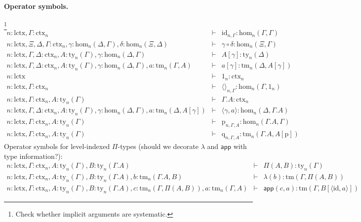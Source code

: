 \documentclass[11pt,a4paper]{article}
\theoremstyle{plain}
\theoremstyle{definition}
\newcommand{\id}{\mathsf{id}}
\newcommand{\app}[2]{{#1\,#2}} %
\def\Hom{\mathrm{hom}}
\def\id{\mathrm{id}}
\def\lctx{\mathrm{lctx}}
\newcommand{\ctx}{\mathrm{ctx}}
\newcommand{\ty}{\mathrm{ty}}
\newcommand{\tm}{\mathrm{tm}}
\newcommand{\tuple}[1]{\langle #1 \rangle}
\newcommand{\cext}{.}
\def\p{\mathrm{p}}
\def\q{\mathrm{q}}
\def\app{\mathsf{app}}
\begin{document}
\paragraph{Operator symbols.} \footnote{Check whether implicit arguments are systematic.}
\begin{eqnarray*}
n : \lctx, \Gamma : \ctx_n &\vdash& \id_{n,\Gamma} : \Hom_n(\Gamma,\Gamma)\\
n : \lctx, \Xi,\Delta,\Gamma : \ctx_n, \gamma : \Hom_n(\Delta,\Gamma), \delta : \Hom_n(\Xi,\Delta) &\vdash&
\gamma \circ \delta : \Hom_n(\Xi,\Gamma)\\
n : \lctx, \Gamma,\Delta : \ctx_n, A:\ty_n(\Gamma), \gamma : \Hom_n(\Delta,\Gamma) &\vdash&
A[\gamma] : \ty_n(\Delta)\\
n : \lctx, \Gamma,\Delta : \ctx_n, A:\ty_n(\Gamma), \gamma : \Hom_n(\Delta,\Gamma), a:\tm_n(\Gamma,A) &\vdash&  a[\gamma] : \tm_n(\Delta,A[\gamma])\\
n : \lctx &\vdash& 1_n : \ctx_n\\
n : \lctx, \Gamma : \ctx_n &\vdash& \tuple{}_{n,\Gamma} : \Hom_n(\Gamma,1_n)\\
n : \lctx, \Gamma : \ctx_n, A:\ty_n (\Gamma) &\vdash& \Gamma \cext A : \ctx_n \\
n : \lctx, \Gamma,\Delta : \ctx_n , A:\ty_n (\Gamma), \gamma : \Hom_n (\Delta,\Gamma), a:\tm_n (\Delta,A[\gamma]) &\vdash& \tuple{\gamma,a} : \Hom_n (\Delta,\Gamma\cext A)\\
n : \lctx, \Gamma : \ctx_n , A:\ty_n (\Gamma) &\vdash& \p_{n,\Gamma,A}: \Hom_n (\Gamma\cext A,\Gamma)\\
n : \lctx, \Gamma : \ctx_n , A:\ty_n (\Gamma) &\vdash& \q_{n,\Gamma,A}: \tm_n (\Gamma\cext A,A[\p])
\end{eqnarray*}
Operator symbols for level-indexed $\Pi$-types (should we decorate $\lambda$ and $\app$ with type information?):
\begin{eqnarray*}
n : \lctx, \Gamma : \ctx_n, A : \ty_n(\Gamma), B : \ty_n(\Gamma.A)&\vdash& \Pi(A,B) : \ty_n(\Gamma)\\
n : \lctx, \Gamma : \ctx_n, A : \ty_n(\Gamma), B : \ty_n(\Gamma.A), b : \tm_n(\Gamma.A, B) &\vdash& \lambda(b) : \tm(\Gamma,\Pi(A,B))\\
n : \lctx, \Gamma : \ctx_n, A : \ty_n(\Gamma), B : \ty_n(\Gamma.A), c :  \tm_n(\Gamma,\Pi(A,B)), a : \tm_n(\Gamma, A) &\vdash& \app(c,a) : \tm(\Gamma, B[\tuple{\id,a}])
\end{eqnarray*}
\end{document}
